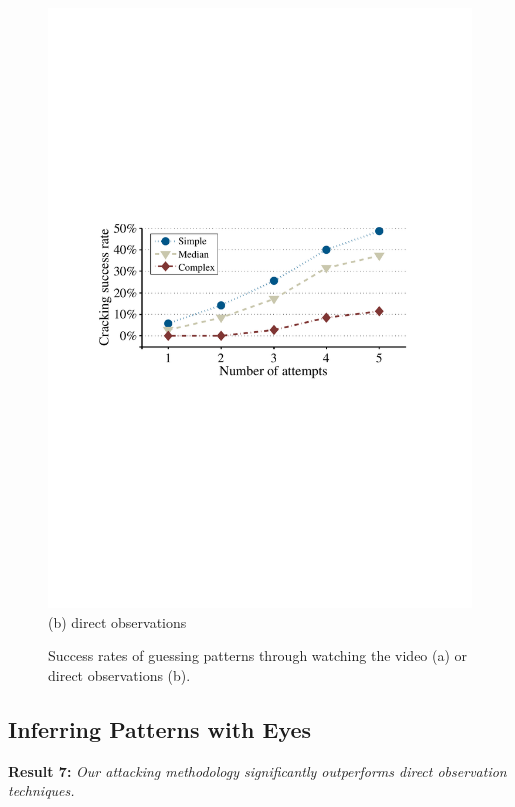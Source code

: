 \begin{figure}[!t]
{\begin{minipage}[t]{0.45\textwidth}
                \includegraphics[width=\textwidth]{fig/look-finger.pdf}\\
                \centering  (b) direct observations
                \end{minipage}
            }
            \vspace{-2mm}
            \caption{Success rates of guessing patterns through watching the video (a) or direct observations (b).}
            \label{fig:look-unlocking process}
        \end{figure}

    \subsection{Inferring Patterns with Eyes}

    \noindent \textbf{Result 7:} \emph{Our attacking methodology significantly outperforms direct observation techniques.}

